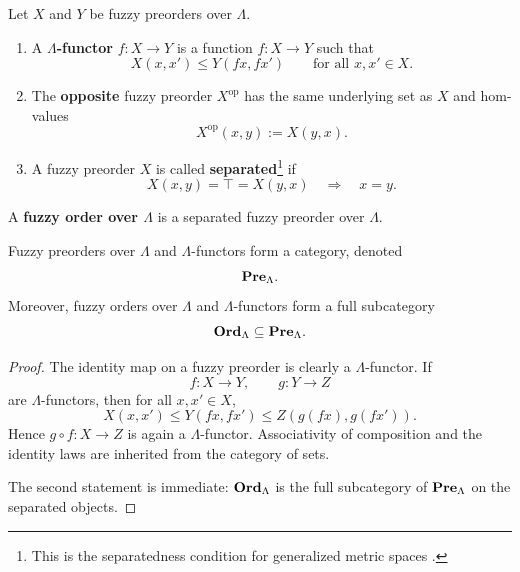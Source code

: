 \begin{definition}
\label{def:lambda-functor-opposite-separated}
    Let \(X\) and \(Y\) be fuzzy preorders over \(\Lambda\).
    \begin{enumerate}[label=\textup{(\arabic*)}]
        \item A \textbf{\(\Lambda\)-functor} \(f:X\to Y\) is a function
        \(f:X\to Y\) such that
        \[
            X(x,x')\leq Y(fx,fx')
            \qquad
            \text{for all }x,x'\in X.
        \]

        \item The \textbf{opposite} fuzzy preorder \(X^{\mathrm{op}}\)
        has the same underlying set as \(X\) and hom-values
        \[
            X^{\mathrm{op}}(x,y):=X(y,x).
        \]

        \item A fuzzy preorder \(X\) is called \textbf{separated}\footnote{This is the separatedness condition for generalized metric spaces \cite[Example~2.3]{stubbe-2014-quantaloid-enriched}.} if
        \[
            X(x,y)=\top=X(y,x)
            \quad\Longrightarrow\quad
            x=y.
        \]
    \end{enumerate}
    A \textbf{fuzzy order over \(\Lambda\)} is a separated fuzzy preorder
    over \(\Lambda\).
\end{definition}

\begin{proposition}\label{prop:fuzzy-preorders-form-category}
    Fuzzy preorders over \(\Lambda\) and \(\Lambda\)-functors form a category, denoted
    \[
        \mathbf{Pre}_\Lambda.
    \]
    Moreover, fuzzy orders over \(\Lambda\) and \(\Lambda\)-functors form a full subcategory
    \[
        \mathbf{Ord}_\Lambda\subseteq \mathbf{Pre}_\Lambda.
    \]
\end{proposition}

\begin{proof}
    The identity map on a fuzzy preorder is clearly a \(\Lambda\)-functor. If
    \[
        f:X\to Y,
        \qquad
        g:Y\to Z
    \]
    are \(\Lambda\)-functors, then for all \(x,x'\in X\),
    \[
        X(x,x')\leq Y(fx,fx')\leq Z(g(fx),g(fx')).
    \]
    Hence \(g\circ f:X\to Z\) is again a \(\Lambda\)-functor. Associativity of composition and the identity laws are inherited from the category of sets.

    The second statement is immediate: \(\mathbf{Ord}_\Lambda\) is the full subcategory of \(\mathbf{Pre}_\Lambda\) on the separated objects.
\end{proof}

